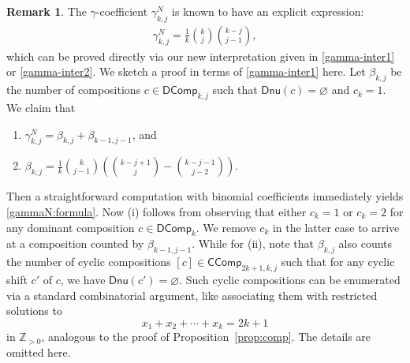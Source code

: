 \documentclass[reqno]{amsart}
\numberwithin{equation}{section}
\newtheorem{corollary}[theorem]{Corollary}
\theoremstyle{definition}
\newtheorem{remark}{Remark}[section]
\theoremstyle{named}
\newcommand{\bZ}{\mathbb{Z}}
\def\CComp{\mathsf{CComp}}
\def\DComp{\mathsf{DComp}}
\def\Dnu{\mathsf{Dnu}}
\begin{document}
\begin{remark}
The $\gamma$-coefficient $\gamma^N_{k,j}$ is known to have an explicit expression:
\begin{align}\label{gammaN:formula}
\gamma^N_{k,j}=\frac{1}{k}\binom{k}{j}\binom{k-j}{j-1},
\end{align}
which can be proved directly via our new interpretation given in \eqref{gamma-inter1} or \eqref{gamma-inter2}. We sketch a proof in terms of \eqref{gamma-inter1} here. Let $\beta_{k,j}$ be the number of compositions $c\in\DComp_{k,j}$ such that $\Dnu(c)=\varnothing$ and $c_k=1$. We claim that
\begin{enumerate}
	\item $\gamma^N_{k,j}=\beta_{k,j}+\beta_{k-1,j-1}$, and
	\item $\beta_{k,j}=\frac{1}{k}\binom{k}{j-1}\left(\binom{k-j+1}{j}-\binom{k-j-1}{j-2}\right)$.
\end{enumerate}
Then a straightforward computation with binomial coefficients immediately yields \eqref{gammaN:formula}. Now (i) follows from observing that either $c_k=1$ or $c_k=2$ for any dominant composition $c\in\DComp_k$. We remove $c_k$ in the latter case to arrive at a composition counted by $\beta_{k-1,j-1}$. While for (ii), note that $\beta_{k,j}$ also counts the number of cyclic compositions $[c]\in\CComp_{2k+1,k,j}$ such that for any cyclic shift $c'$ of $c$, we have $\Dnu(c')=\varnothing$. Such cyclic compositions can be enumerated via a standard combinatorial argument, like associating them with restricted solutions to
$$x_1+x_2+\cdots+x_k=2k+1$$
in $\bZ_{>0}$, analogous to the proof of Proposition~\ref{prop:comp}. The details are omitted here.
\end{remark}


\end{document}
